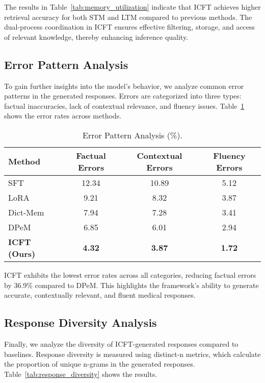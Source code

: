 The results in Table~\ref{tab:memory_utilization} indicate that ICFT achieves higher retrieval accuracy for both STM and LTM compared to previous methods. The dual-process coordination in ICFT ensures effective filtering, storage, and access of relevant knowledge, thereby enhancing inference quality.

\subsection{Error Pattern Analysis}

To gain further insights into the model's behavior, we analyze common error patterns in the generated responses. Errors are categorized into three types: factual inaccuracies, lack of contextual relevance, and fluency issues. Table~\ref{tab:error_analysis} shows the error rates across methods.

\begin{table}[ht]
\centering
\caption{Error Pattern Analysis (\%).}
\label{tab:error_analysis}
\begin{tabular}{lccc}
\toprule
\textbf{Method} & \textbf{Factual Errors} & \textbf{Contextual Errors} & \textbf{Fluency Errors} \\
\midrule
SFT               & 12.34 & 10.89 & 5.12 \\
LoRA              & 9.21  & 8.32  & 3.87 \\
Dict-Mem          & 7.94  & 7.28  & 3.41 \\
DPeM              & 6.85  & 6.01  & 2.94 \\
\textbf{ICFT (Ours)} & \textbf{4.32}  & \textbf{3.87}  & \textbf{1.72} \\
\bottomrule
\end{tabular}
\end{table}

ICFT exhibits the lowest error rates across all categories, reducing factual errors by 36.9\% compared to DPeM. This highlights the framework's ability to generate accurate, contextually relevant, and fluent medical responses.

\subsection{Response Diversity Analysis}

Finally, we analyze the diversity of ICFT-generated responses compared to baselines. Response diversity is measured using distinct-n metrics, which calculate the proportion of unique n-grams in the generated responses. Table~\ref{tab:response_diversity} shows the results.

